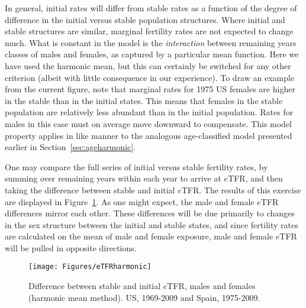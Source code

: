 In general, initial rates will differ from stable rates as a function of the
degree of difference in the initial versus stable population structures. Where
initial and stable structures are similar, marginal fertility rates are not
expected to change much. What is constant in the model is the
\textit{interaction} between remaining years classes of males and females, as
captured by a particular mean function. Here we have used the harmonic mean, but
this can certainly be switched for any other criterion (albeit with little
consequence in our experience). To draw an example from the current figure, note
that marginal rates for 1975 US females are higher in the stable than in the
initial states. This means that females in the stable population are relatively
less abundant than in the initial population. Rates for males in this case must
on average move downward to compensate. This model property applies in like 
manner to the analogous age-classified model
presented earlier in Section~\ref{sec:ageharmonic}.

One may compare the full series of initial versus stable fertility rates, by
summing over remaining years within each year to arrive at $e$TFR, and then
taking the difference between stable and initial $e$TFR. The results of this
exercise are displayed in Figure~\ref{fig:eTFRharmonic}. As one might expect,
the male and female $e$TFR differences mirror each other. These differences will
be due primarily to changes in the sex structure between the initial and stable
states, and since fertility rates are calculated on the mean of male and female
exposure, male and female $e$TFR will be pulled in opposite directions.

\begin{figure}[ht!]
        \centering  
          \caption{Difference between stable and initial $e$TFR, males and
          females (harmonic mean method). US, 1969-2009 and Spain,
          1975-2009.}
           \texttt{[image: Figures/eTFRharmonic]}
          \label{fig:eTFRharmonic}
\end{figure}

\FloatBarrier